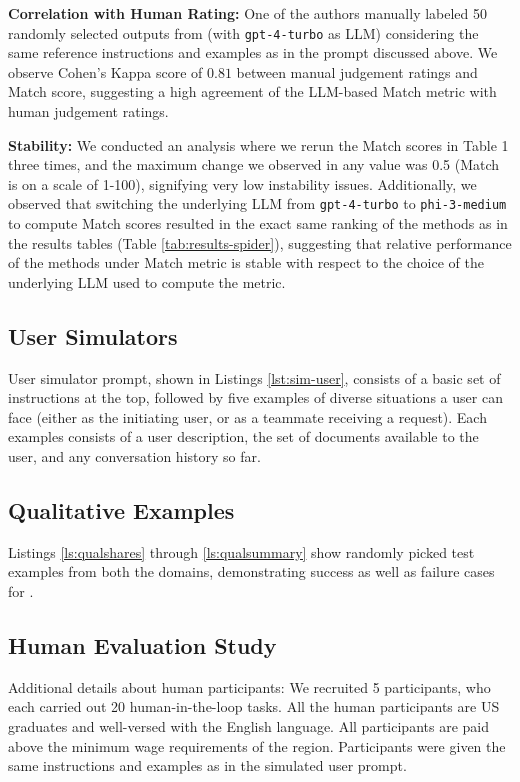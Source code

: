 \textbf{Correlation with Human Rating:} %
One of the authors manually labeled 50 randomly selected outputs from \reactagent{} (with \texttt{gpt-4-turbo} as LLM) considering the same reference instructions and examples as in the prompt discussed above. We observe Cohen's Kappa score of $0.81$ between manual judgement ratings and Match score, suggesting a high agreement of the LLM-based Match metric with human judgement ratings.

\textbf{Stability:} 
We conducted an analysis where we rerun the Match scores in Table 1 three times, and the maximum change we observed in any value was 0.5 (Match is on a scale of 1-100), signifying very low instability issues. 
Additionally, we observed that switching the underlying LLM from \texttt{gpt-4-turbo} to \texttt{phi-3-medium} to compute Match scores resulted in the exact same ranking of the methods as in the results tables (Table \ref{tab:results-spider}), suggesting that relative performance of the methods under Match metric is stable with respect to the choice of the underlying LLM used to compute the metric. 






\subsection{User Simulators}
\label{appendix-user-sim}

User simulator prompt, shown in Listings \ref{lst:sim-user}, consists of a basic set of instructions at the top, followed by five  examples of diverse situations a user can face (either as the initiating user, or as a teammate receiving a request). 
Each examples consists of a user description, the set of documents available to the user, and any conversation history so far.


\subsection{Qualitative Examples}
\label{appendix-qual}

Listings \ref{ls:qualshares} through \ref{ls:qualsummary} show randomly picked test examples from both the domains, demonstrating success as well as failure cases for \reactagent{}.

\subsection{Human Evaluation Study}
\label{appendix-humaneval}
Additional details about human participants: We recruited 5 participants, who each carried out 20 human-in-the-loop tasks. All the human participants are US graduates and well-versed with the English language. 
All participants are paid above the minimum wage requirements of the region.
Participants were given the same instructions and examples as in the simulated user prompt.  


